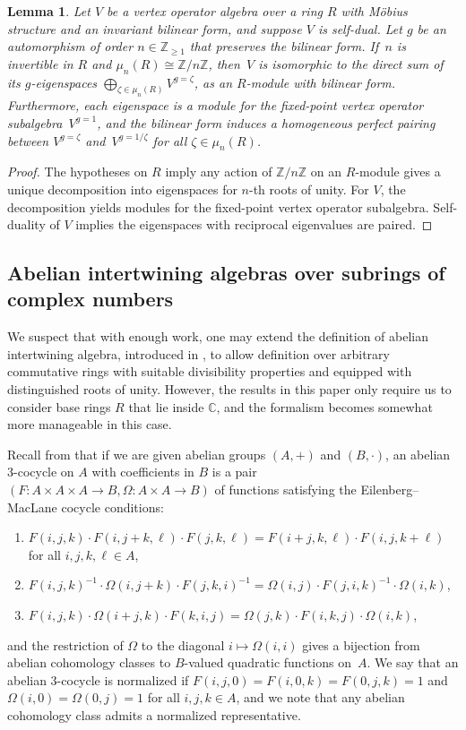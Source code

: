 \documentclass[11pt]{article}
\newcommand{\bC}{\mathbb{C}}
\newcommand{\bZ}{\mathbb{Z}}
\newtheorem{lem}[thm]{Lemma}
\theoremstyle{definition}
\begin{document}
\begin{lem} \label{lem:decomposition-is-still-self-dual}Let $V$ be a vertex operator algebra over a ring $R$ with M\"obius structure and an invariant bilinear form, and suppose $V$ is self-dual. Let $g$ be an automorphism of order $n \in \bZ_{\geq 1}$ that preserves the bilinear form. If~$n$ is invertible in $R$ and $\mu_n(R) \cong \bZ/n\bZ$, then~$V$ is isomorphic to the direct sum of its $g$-eigenspaces $\bigoplus_{\zeta \in \mu_n(R)} V^{g = \zeta}$, as an $R$-module with bilinear form. Furthermore, each eigenspace is a module for the fixed-point vertex operator subalgebra~$V^{g=1}$, and the bilinear form induces a homogeneous perfect pairing between $V^{g = \zeta}$ and~$V^{g = 1/\zeta}$ for all $\zeta \in \mu_n(R)$.
\end{lem}
\begin{proof}The hypotheses on $R$ imply any action of $\bZ/n\bZ$ on an $R$-module gives a unique decomposition into eigenspaces for $n$-th roots of unity. For $V$, the decomposition yields modules for the fixed-point vertex operator subalgebra. Self-duality of $V$ implies the eigenspaces with reciprocal eigenvalues are paired.
\end{proof}

\subsection{Abelian intertwining algebras over subrings of complex numbers}

We suspect that with enough work, one may extend the definition of abelian intertwining algebra, introduced in \cite{DL93}, to allow definition over arbitrary commutative rings with suitable divisibility properties and equipped with distinguished roots of unity. However, the results in this paper only require us to consider base rings $R$ that lie inside $\bC$, and the formalism becomes somewhat more manageable in this case.

Recall from \cite{M52} that if we are given abelian groups $(A,+)$ and $(B,\cdot)$, an abelian 3-cocycle on $A$ with coefficients in $B$ is a pair $(F\colon A \times A \times A \to B, \Omega\colon A \times A \to B)$ of functions satisfying the Eilenberg--MacLane cocycle conditions:
\begin{enumerate}\itemsep=0pt
\item[1)] $F(i,j,k) \cdot F(i,j+k,\ell) \cdot F(j,k,\ell) = F(i+j,k,\ell) \cdot F(i,j,k+\ell)$ for all $i,j,k,\ell \in A$,
\item[2)] $F(i,j,k)^{-1} \cdot \Omega(i,j+k) \cdot F(j,k,i)^{-1} = \Omega(i,j) \cdot F(j,i,k)^{-1} \cdot \Omega(i,k)$,
\item[3)] $F(i,j,k) \cdot \Omega(i+j,k) \cdot F(k,i,j) = \Omega(j,k) \cdot F(i,k,j) \cdot \Omega(i,k)$,
\end{enumerate}
and the restriction of $\Omega$ to the diagonal $i \mapsto \Omega(i,i)$ gives a bijection from abelian cohomology classes to $B$-valued quadratic functions on~$A$. We say that an abelian 3-cocycle is normalized if $F(i,j,0) = F(i,0,k) = F(0,j,k) = 1$ and $\Omega(i,0) = \Omega(0,j) = 1$ for all $i,j,k \in A$, and we note that any abelian cohomology class admits a normalized representative.
\end{document}
